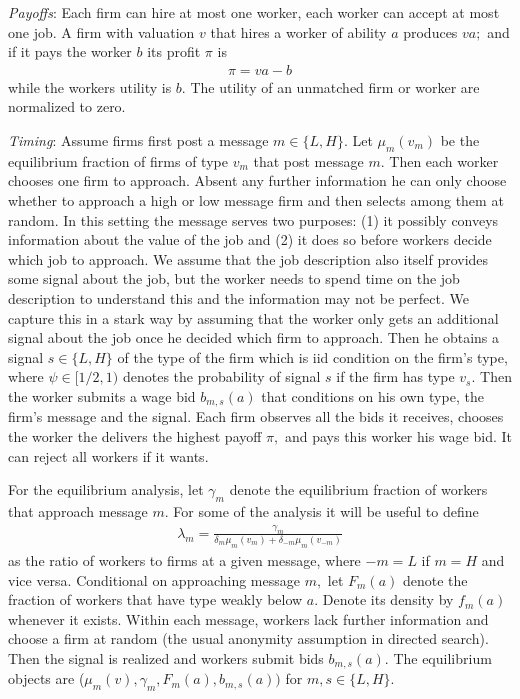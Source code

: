 \documentclass[12pt]{article}
\begin{document}

\textit{Payoffs}:
Each firm can hire at most one worker, each worker can accept at most one job.
A firm with valuation $v$ that hires a worker of ability $a$ produces $va;$ and if it pays the worker $b$ its profit $\pi $ is
\begin{align}
 \pi =va-b 
\end{align}
while the workers utility is $b.$
The utility of an unmatched firm or worker are normalized to zero.


\textit{Timing}:
Assume firms first post a message $m\in \{L,H\}.$
Let $\mu_{m}(v_{m})$ be the equilibrium fraction of firms of type $v_{m}$ that post message $m.$
Then each worker chooses one firm to approach.
Absent any further information he can only choose whether to approach a high or low message firm and then selects among them at random.
In this setting the message serves two purposes: (1) it possibly conveys information about the value of the job and (2) it does so before workers decide which job to approach.
We assume that the job description also itself provides some signal about the job, but the worker needs to spend time on the job description to understand this and the information may not be perfect.
We capture this in a stark way by assuming that the worker only gets an additional signal about the job once he decided which firm to approach.
Then he obtains a signal $s\in \{L,H\}$ of the type of the firm which is iid condition on the firm's type, where $\psi \in \lbrack 1/2,1)$ denotes the probability of signal $s$ if the firm has type $v_{s}.$
Then the worker submits a wage bid $b_{m,s}(a)$ that conditions on his own type, the firm's message and the signal.
Each firm observes all the bids it receives, chooses the worker the delivers the highest payoff $\pi ,$ and pays this worker his wage bid.
It can reject all workers if it wants.

For the equilibrium analysis, let $\gamma _{m}$ denote the equilibrium fraction of workers that approach message $m.$
For some of the analysis it will be useful to define 
\begin{align*}
\lambda _{m}=\frac{\gamma _{m}}{\delta _{m}\mu _{m}(v_{m})+\delta _{-m}\mu_{m}(v_{-m})} 
\end{align*}
as the ratio of workers to firms at a given message, where $-m=L$ if $m=H$ and vice versa.
Conditional on approaching message $m,$ let $F_{m}(a)$ denote the fraction of workers that have type weakly below $a.$
Denote its density by $f_{m}(a)$ whenever it exists.
Within each message, workers lack further information and choose a firm at random (the usual anonymity assumption in directed search).
Then the signal is realized and workers submit bids $b_{m,s}(a)$.
The equilibrium objects are ($\mu _{m}(v),\gamma_{m},F_{m}(a),b_{m,s}(a))$ for $m,s\in \{L,H\}$.
\end{document}
